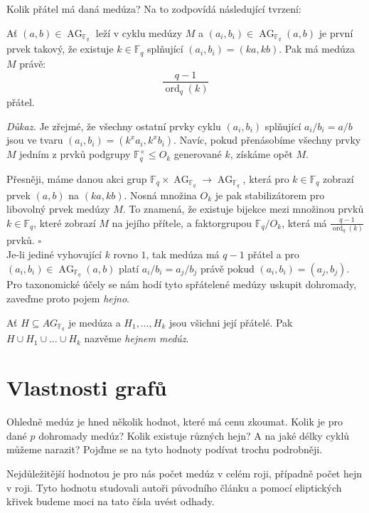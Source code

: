 \documentclass[12pt]{report}
\DeclareMathOperator{\ord}{ord}
\DeclareMathOperator{\AG}{AG}
\begin{document}
Kolik přátel má daná medúza? Na to zodpovídá následující tvrzení:
\begin{veta}\label{isom}
Ať $(a,b) \in \AG_{\mathbb{F}_q}$ leží v cyklu medúzy $M$ a $(a_i,b_i) \in \AG_{\mathbb{F}_q}(a,b)$ je první prvek takový, že existuje $k \in \mathbb{F}_q$ splňující $(a_i,b_i) = (ka, kb)$. Pak má medúza $M$ právě:
$$\frac{q-1}{\ord_q (k)}$$
přátel.
\end{veta}

\noindent \textit{Důkaz.} Je zřejmé, že všechny ostatní prvky cyklu $(a_i,b_i)$ splňující $a_i/b_i = a/b$ jsou ve tvaru $(a_i,b_i) = (k^x a_i, k^x b_i)$. Navíc, pokud přenásobíme všechny prvky $M$ jedním z prvků podgrupy $\mathbb{F}_q ^{\times} \leqslant O_k$ generované $k$, získáme opět $M$.

Přesněji, máme danou akci grup $\mathbb{F}_q \times \AG_{\mathbb{F}_q} \longrightarrow \AG_{\mathbb{F}_q}$, která pro $k \in \mathbb{F}_q$ zobrazí prvek $(a,b)$ na $(ka,kb)$. Nosná množina $O_k$ je pak stabilizátorem pro libovolný prvek medúzy $M$. To znamená, že existuje bijekce mezi množinou prvků $k \in \mathbb{F}_q$, které zobrazí $M$ na jejího přítele, a faktorgrupou $\mathbb{F}_q/O_k$, která má $\frac{q-1}{\ord_q (k)}$ prvků. \hfill $\square$\\

Je-li jediné vyhovující $k$ rovno $1$, tak medúza má $q-1$ přátel a pro $(a_i,b_i) \in \AG_{\mathbb{F}_q}(a,b)$ platí $a_i/b_i = a_j/b_j$ právě pokud $(a_i,b_i) = (a_j,b_j)$. Pro taxonomické účely se nám hodí tyto spřátelené medúzy uskupit dohromady, zaveďme proto pojem \textit{hejno}.
\begin{definice}
Ať $H \subseteq AG_{\mathbb{F}_q}$ je medúza a $H_1,\dots,H_k$ jsou všichni její přátelé. Pak $H \cup H_1 \cup \dots \cup H_k$ nazvěme \textit{hejnem medúz}.
\end{definice}
 
 
\section{Vlastnosti grafů}

Ohledně medúz je hned několik hodnot, které má cenu zkoumat. Kolik je pro dané $p$ dohromady medúz? Kolik existuje různých hejn? A na jaké délky cyklů můžeme narazit? Pojďme se na tyto hodnoty podívat trochu podrobněji.

Nejdůležitější hodnotou je pro nás počet medúz v celém roji, případně počet hejn v roji. Tyto hodnotu studovali autoři původního článku \cite{Meduza} a pomocí eliptických křivek budeme moci na tato čísla uvést odhady.
\end{document}
